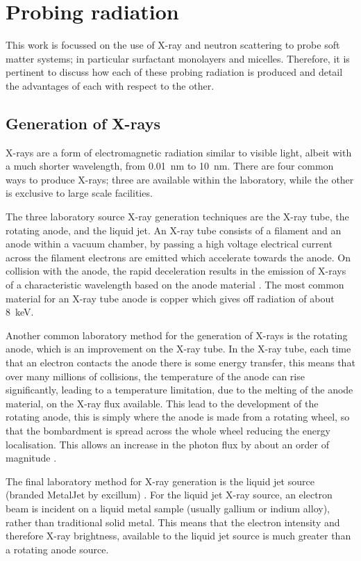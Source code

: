 \section{Probing radiation}

This work is focussed on the use of X-ray and neutron scattering to probe soft matter systems; in particular surfactant monolayers and micelles. Therefore, it is pertinent to discuss how each of these probing radiation is produced and detail the advantages of each with respect to the other.

\subsection{Generation of X-rays}

X-rays are a form of electromagnetic radiation similar to visible light, albeit with a much shorter wavelength, from \SI{0.01}{\nano\meter} to \SI{10}{\nano\meter}.
There are four common ways to produce X-rays; three are available within the laboratory, while the other is exclusive to large scale facilities.

The three laboratory source X-ray generation techniques are the X-ray tube, the rotating anode, and the liquid jet.
An X-ray tube consists of a filament and an anode within a vacuum chamber, by passing a high voltage electrical current across the filament electrons are emitted which accelerate towards the anode.
On collision with the anode, the rapid deceleration results in the emission of X-rays of a characteristic wavelength based on the anode material \cite{schnablegger_saxs_2017}.
The most common material for an X-ray tube anode is copper which gives off radiation of about \SI{8}{\kilo\eV}.

Another common laboratory method for the generation of X-rays is the rotating anode, which is an improvement on the X-ray tube.
In the X-ray tube, each time that an electron contacts the anode there is some energy transfer, this means that over many millions of collisions, the temperature of the anode can rise significantly, leading to a temperature limitation, due to the melting of the anode material, on the X-ray flux available.
This lead to the development of the rotating anode, this is simply where the anode is made from a rotating wheel, so that the bombardment is spread across the whole wheel reducing the energy localisation.
This allows an increase in the photon flux by about an order of magnitude \cite{schnablegger_saxs_2017}.

The final laboratory method for X-ray generation is the liquid jet source (branded MetalJet by excillum) \cite{noauthor_metaljet_nodate}.
For the liquid jet X-ray source, an electron beam is incident on a liquid metal sample (usually gallium or indium alloy), rather than traditional solid metal.
This means that the electron intensity and therefore X-ray brightness, available to the liquid jet source is much greater than a rotating anode source.

